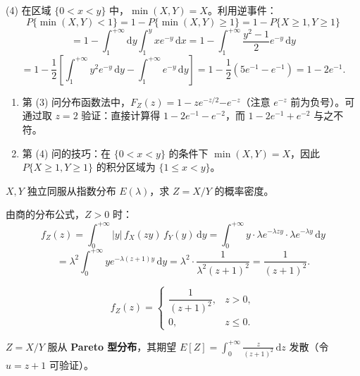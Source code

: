 ﻿\documentclass[lang=cn,11pt]{elegantbook}
\begin{document}
\begin{solution}
\[\]
(4) 在区域 $\{0 < x < y\}$ 中，$\min(X,Y) = X$。利用逆事件：
\[
P\{\min(X,Y) < 1\} = 1 - P\{\min(X,Y) \geqslant 1\} = 1 - P\{X \geqslant 1, Y \geqslant 1\}
\]
\[
= 1 - \int_1^{+\infty}\mathrm{d}y\int_1^y xe^{-y}\,\mathrm{d}x = 1 - \int_1^{+\infty}\frac{y^2-1}{2}e^{-y}\,\mathrm{d}y
\]
\[
= 1 - \frac{1}{2}\left[\int_1^{+\infty}y^2 e^{-y}\,\mathrm{d}y - \int_1^{+\infty}e^{-y}\,\mathrm{d}y\right] = 1 - \frac{1}{2}(5e^{-1} - e^{-1}) = 1 - 2e^{-1}.
\]
\begin{note}
\begin{enumerate}
    \item 第 (3) 问分布函数法中，$F_Z(z) = 1 - ze^{-z/2} \boldsymbol{-} e^{-z}$（注意 $e^{-z}$ 前为负号）。可通过取 $z = 2$ 验证：直接计算得 $1 - 2e^{-1} - e^{-2}$，而 $1 - 2e^{-1} + e^{-2}$ 与之不符。
    \item 第 (4) 问的技巧：在 $\{0 < x < y\}$ 的条件下 $\min(X,Y) = X$，因此 $P\{X \geqslant 1, Y \geqslant 1\}$ 的积分区域为 $\{1 \leqslant x < y\}$。
\end{enumerate}
\end{note}
\end{solution}


\begin{exercise}[商的分布] \label{exer:3-c15}
$X, Y$ 独立同服从指数分布 $E(\lambda)$，求 $Z = X/Y$ 的概率密度。
\end{exercise}

\begin{solution}
由商的分布公式，$Z > 0$ 时：
\[
f_Z(z) = \int_0^{+\infty}|y|\,f_X(zy)\,f_Y(y)\,\mathrm{d}y = \int_0^{+\infty}y\cdot\lambda e^{-\lambda zy}\cdot\lambda e^{-\lambda y}\,\mathrm{d}y
\]
\[
= \lambda^2\int_0^{+\infty}ye^{-\lambda(z+1)y}\,\mathrm{d}y = \lambda^2\cdot\frac{1}{\lambda^2(z+1)^2} = \frac{1}{(z+1)^2}.
\]

\[
f_Z(z) = \begin{cases} \dfrac{1}{(z+1)^2}, & z > 0, \\ 0, & z \leqslant 0. \end{cases}
\]

\begin{note}
$Z = X/Y$ 服从 \textbf{Pareto 型分布}，其期望 $E[Z] = \displaystyle\int_0^{+\infty}\frac{z}{(z+1)^2}\,\mathrm{d}z$ 发散（令 $u = z+1$ 可验证）。
\end{note}
\end{solution}
\end{document}
